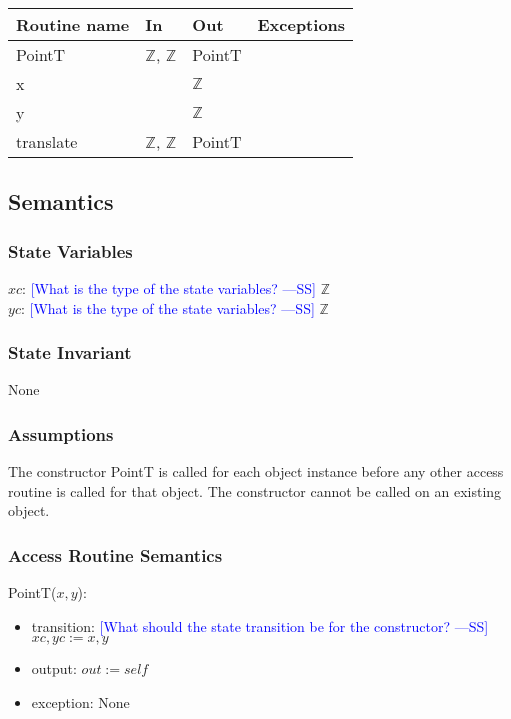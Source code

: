 \documentclass[12pt]{article}
\newcommand{\authornote}[3]{\textcolor{#1}{[#3 ---#2]}}
\newcommand{\authornote}[3]{}
\newcommand{\wss}[1]{\authornote{blue}{SS}{#1}}
\begin{document}
\begin{tabular}{| l | l | l | l |}
\hline
\textbf{Routine name} & \textbf{In} & \textbf{Out} & \textbf{Exceptions}\\
\hline
PointT & $\mathbb{Z}$, $\mathbb{Z}$ & PointT & \\
\hline
x & ~ & $\mathbb{Z}$ & ~\\
\hline
y & ~ & $\mathbb{Z}$ & ~\\
\hline
translate & $\mathbb{Z}$, $\mathbb{Z}$ & PointT & ~\\
\hline
\end{tabular}

\subsection* {Semantics}

\subsubsection* {State Variables}

$xc$: \wss{What is the type of the state variables?} $\mathbb{Z}$ 
\\ $yc$:  \wss{What is the type of the state variables?} $\mathbb{Z}$

\subsubsection* {State Invariant}

None

\subsubsection* {Assumptions}

The constructor PointT is called for each object instance before any other
access routine is called for that object.  The constructor cannot be called on
an existing object.

\subsubsection* {Access Routine Semantics}

PointT($x, y$):
\begin{itemize}
\item transition: \wss{What should the state transition be for the constructor?} $xc, yc := x, y$
\item output: $out := \mathit{self}$
\item exception: None
\end{itemize}
\end{document}
